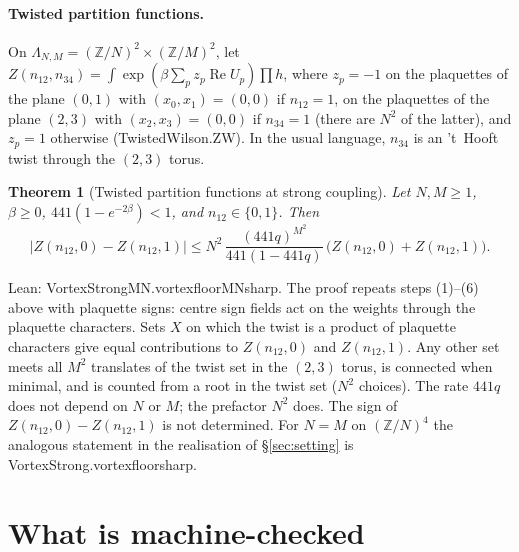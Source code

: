 \documentclass[11pt,a4paper]{article}
\newtheorem{theorem}{Theorem}[section]
\theoremstyle{definition}
\theoremstyle{remark}
\newcommand{\leanus}{\textunderscore\allowbreak{}}
\newcommand{\leandot}{.\allowbreak{}}
\newcommand{\lean}[1]{{\ttfamily\let\_\leanus #1}}
\newcommand{\Z}{\mathbb{Z}}
\renewcommand{\Re}{\operatorname{Re}}
\begin{document}
\paragraph{Twisted partition functions.} On $\Lambda_{N,M}=(\Z/N)^2\times(\Z/M)^2$, let $Z(n_{12},n_{34})=\int\exp(\beta\sum_pz_p\Re U_p)\prod h$, where $z_p=-1$ on the plaquettes of the plane $(0,1)$ with $(x_0,x_1)=(0,0)$ if $n_{12}=1$, on the plaquettes of the plane $(2,3)$ with $(x_2,x_3)=(0,0)$ if $n_{34}=1$ (there are $N^2$ of the latter), and $z_p=1$ otherwise (\lean{TwistedWilson\leandot{}ZW}). In the usual language, $n_{34}$ is an 't~Hooft twist through the $(2,3)$ torus.

\begin{theorem}[Twisted partition functions at strong coupling]\label{thm:vortex}
Let $N,M\ge1$, $\beta\ge0$, $441(1-e^{-2\beta})<1$, and $n_{12}\in\{0,1\}$. Then
\[
|Z(n_{12},0)-Z(n_{12},1)|\le N^2\,\frac{(441q)^{M^2}}{441(1-441q)}\,\bigl(Z(n_{12},0)+Z(n_{12},1)\bigr).
\]
\end{theorem}
Lean: \lean{VortexStrongMN\leandot{}vortex\_floor\_MN\_sharp}. The proof repeats steps (1)--(6) above with plaquette signs: centre sign fields act on the weights through the plaquette characters. Sets $X$ on which the twist is a product of plaquette characters give equal contributions to $Z(n_{12},0)$ and $Z(n_{12},1)$. Any other set meets all $M^2$ translates of the twist set in the $(2,3)$ torus, is connected when minimal, and is counted from a root in the twist set ($N^2$ choices). The rate $441q$ does not depend on $N$ or $M$; the prefactor $N^2$ does. The sign of $Z(n_{12},0)-Z(n_{12},1)$ is not determined. For $N=M$ on $(\Z/N)^4$ the analogous statement in the realisation of \S\ref{sec:setting} is \lean{VortexStrong\leandot{}vortex\_floor\_sharp}.

\section{What is machine-checked}\label{sec:lean}
\end{document}
